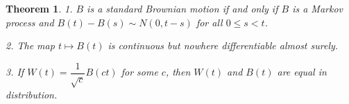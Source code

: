 \documentclass{article}
\theoremstyle{colontheorem}
\newtheorem{theorem}{Theorem}[section]
\newenvironment{Theorem}
{
	\begin{mdframed}[backgroundcolor=TheoremOrange!10]
	\begin{theorem}
}
{
	\end{theorem}
	\end{mdframed}
	
	\vspace{.15in}
}
\begin{document}
\begin{Theorem}
	
	1. $B$ is a standard Brownian motion if and only if $B$ is a Markov process and $B(t) - B(s) \sim N(0, t - s)$ for all $0 \leq s < t$.
	
	2. The map $t \longmapsto B(t)$ is continuous but nowhere differentiable almost surely.
	
	3. If $W(t) = \dfrac{1}{\sqrt{c}} B(ct)$ for some $c$, then $W(t)$ and $B(t)$ are equal in distribution.
	 	
\end{Theorem}
\end{document}
